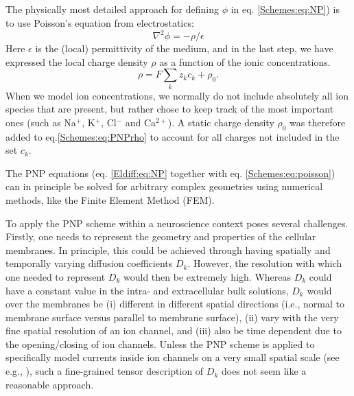 \subsection{}
\label{sec:Schemes:PNP}
The physically most detailed approach for defining $\phi$ in eq. \ref{Schemes:eq:NP}) is to use Poisson's equation from electrostatics:
\begin{equation}
\nabla^2 \phi = -\rho/\epsilon
\label{Schemes:eq:poisson}
\end{equation}
Here $\epsilon$ is the (local) permittivity of the medium, and in the last step, we have expressed the local charge density $\rho$ as a function of the ionic concentrations. 
\begin{equation}
\rho = F\sum_k z_k c_k + \rho_0.
\label{Schemes:eq:PNPrho}
\end{equation}
When we model ion concentrations, we normally do not include absolutely all ion species that are present, but rather chose to keep track of the most important ones (such as Na$^+$, K$^+$, Cl$^-$ and Ca$^{2+}$). A static charge density $\rho_0$ was therefore added to eq.\ref{Schemes:eq:PNPrho} to account for all charges not included in the set $c_k$. 

The PNP equations (eq. \ref{Eldiff:eq:NP} together with eq. \ref{Schemes:eq:poisson}) can in principle be solved for arbitrary complex geometries using numerical methods, like the Finite Element Method (FEM). 

To apply the PNP scheme within a neuroscience context poses several challenges. Firstly, one needs to represent the geometry and properties of the cellular membranes. In principle, this could be achieved through having spatially and temporally varying diffusion coefficients $D_k$. However, the resolution with which one needed to represent $D_k$ would then be extremely high. Whereas $D_k$ could have a constant value in the intra- and extracellular bulk solutions, $D_k$ would over the membranes be (i) different in different spatial directions (i.e., normal to membrane surface versus parallel to membrane surface), (ii) vary with the very fine spatial resolution of an ion channel, and (iii) also be time dependent due to the opening/closing of ion channels. Unless the PNP scheme is applied to specifically model currents inside ion channels on a very small spatial scale (see e.g., \cite{Gardner2011, Zheng2011}), such a fine-grained tensor description of $D_k$ does not seem like a reasonable approach. 

